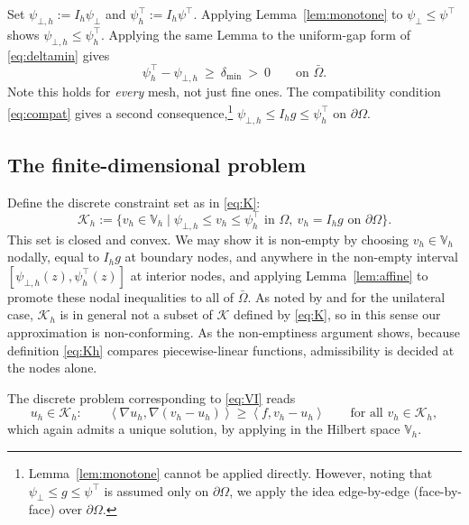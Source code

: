 \documentclass[12pt]{amsart}
\numberwithin{equation}{section}
\theoremstyle{plain}
\theoremstyle{definition}
\theoremstyle{remark}
\newcommand{\Om}{\Omega}
\newcommand{\dOm}{\partial\Omega}
\newcommand{\psilo}{\psi_\bot}
\newcommand{\psiup}{\psi^\top}
\newcommand{\psiloh}{\psi_{\bot,h}}
\newcommand{\psiuph}{\psi^\top_h}
\newcommand{\Vh}{\mathbb{V}_h}
\newcommand{\Ih}{I_h}
\newcommand{\Kh}{\mathcal{K}_h}
\begin{document}
Set $\psiloh := \Ih \psilo$ and $\psiuph := \Ih \psiup$.  Applying Lemma~\ref{lem:monotone} to $\psilo \le \psiup$ shows $\psiloh \le \psiuph$.  Applying the same Lemma to the uniform-gap form of \eqref{eq:deltamin} gives
\begin{equation}
\label{eq:disc-nondeg}
  \psiuph - \psiloh \ \ge\ \delta_{\min} \ >\ 0 \qquad \text{on } \bar\Om.
\end{equation}
Note this holds for \emph{every} mesh, not just fine ones. The compatibility condition \eqref{eq:compat} gives a second consequence,\footnote{Lemma~\ref{lem:monotone} cannot be applied directly.  However, noting that $\psilo \le g \le \psiup$ is assumed only on $\dOm$, we apply the idea edge-by-edge (face-by-face) over $\dOm$.} $\psiloh \le \Ih g \le \psiuph$ on $\dOm$.

\subsection{The finite-dimensional problem}  Define the discrete constraint set as in \eqref{eq:K}:
\begin{equation}
\label{eq:Kh}
  \Kh := \{v_h \in \Vh \mid \psiloh \le v_h \le \psiuph \text{ in } \Om,
    \ v_h = \Ih g \text{ on } \dOm\}.
\end{equation}
This set is closed and convex.  We may show it is non-empty by choosing $v_h \in \Vh$ nodally, equal to $\Ih g$ at boundary nodes, and anywhere in the non-empty interval $[\psiloh(z),\psiuph(z)]$ at interior nodes, and applying Lemma~\ref{lem:affine} to promote these nodal inequalities to all of $\bar\Om$.  As noted by \cite{Ciarlet2002} and \cite{NSV03} for the unilateral case, $\Kh$ is in general not a subset of $\mathcal{K}$ defined by \eqref{eq:K}, so in this sense our approximation is non-conforming.  As the non-emptiness argument shows, because definition \eqref{eq:Kh} compares piecewise-linear functions, admissibility is decided at the nodes alone.

The discrete problem corresponding to \eqref{eq:VI} reads
\begin{equation}
\label{eq:discVI}
  u_h \in \Kh: \qquad
  \left< \nabla u_h, \nabla(v_h - u_h)\right> \ge \left< f, v_h - u_h\right>
  \qquad \text{for all } v_h \in \Kh,
\end{equation}
which again admits a unique solution, by applying \cite{KinderlehrerStampacchia1980} in the Hilbert space $\Vh$.\strut
\end{document}
